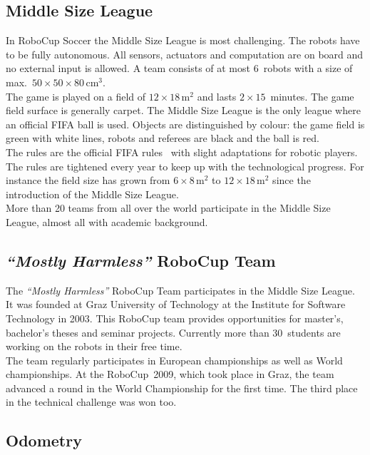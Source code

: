 \documentclass[12pt,a4paper]{article}
\newcommand{\MH}{\emph{``Mostly Harmless''} RoboCup Team\xspace}
\newcommand{\MSL}{Middle Size League\xspace}
\begin{document}

\subsection{\MSL}

In RoboCup Soccer the \MSL is most challenging.
The robots have to be fully autonomous.
All sensors, actuators and computation are on board and no external input is allowed.
A team consists of at most 6~robots with a size of max.\ $50\times50\times80$\,cm$^3$.\\
The game is played on a field of $12\times18$\,m$^2$ and lasts $2\times15$~minutes.
The game field surface is generally carpet.
The \MSL is the only league where an official FIFA ball is used.
Objects are distinguished by colour: the game field is green with white lines, robots and referees are black and the ball is red.\\
The rules are the official FIFA rules~\cite{msl-rules} with slight adaptations for robotic players.
The rules are tightened every year to keep up with the technological progress. 
For instance the field size has grown from $6\times8$\,m$^2$ to $12\times18$\,m$^2$ since the introduction of the \MSL.\\
More than 20 teams from all over the world participate in the \MSL, almost all with academic background.


\subsection{\MH}

The \MH participates in the \MSL. 
It was founded at Graz University of Technology at the Institute for Software Technology in 2003. 
This RoboCup team provides opportunities for master's, bachelor's theses and seminar projects.
Currently more than 30~students are working on the robots in their free time.\\
The team regularly participates in European championships as well as World championships.
At the RoboCup~2009, which took place in Graz, the team advanced a round in the World Championship for the first time.
The third place in the technical challenge was won too.



\subsection{Odometry}
\end{document}
